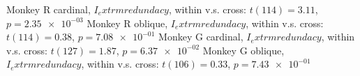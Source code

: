 Monkey R cardinal, $I_	extrm{redundacy}$, within v.s. cross: $t(114) = 3.11$, $p = \num{2.35e-03}$ 
Monkey R oblique, $I_	extrm{redundacy}$, within v.s. cross:  $t(114) = 0.38$, $p = \num{7.08e-01}$ 
Monkey G cardinal, $I_	extrm{redundacy}$, within v.s. cross: $t(127) = 1.87$, $p = \num{6.37e-02}$ 
Monkey G oblique, $I_	extrm{redundacy}$, within v.s. cross:  $t(106) = 0.33$, $p = \num{7.43e-01}$ 
